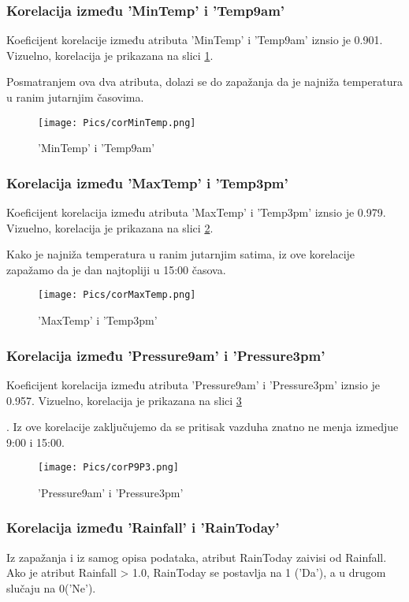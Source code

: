 \documentclass[a4paper]{article}
\begin{document}
\subsubsection{Korelacija između 'MinTemp' i 'Temp9am'}
\label{subsubsec:korMinTemp}
Koeficijent korelacije između atributa 'MinTemp' i 'Temp9am' iznsio je 0.901. Vizuelno, korelacija je prikazana na slici \ref{fig:cor-1}. \par
Posmatranjem ova dva atributa, dolazi se do zapažanja da je najniža temperatura u ranim jutarnjim časovima.
\begin{figure}[H]
     \centering
     \texttt{[image: Pics/corMinTemp.png]}
     \caption{'MinTemp' i 'Temp9am'}
     \label{fig:cor-1}
\end{figure}

\subsubsection{Korelacija između 'MaxTemp' i 'Temp3pm'}
\label{subsubsec:korMaxTemp}
Koeficijent korelacija između atributa 'MaxTemp' i 'Temp3pm' iznsio je 0.979. Vizuelno, korelacija je prikazana na slici \ref{fig:cor-2}.\par
Kako je najniža temperatura u ranim jutarnjim satima, iz ove korelacije zapažamo da je dan najtopliji u 15:00 časova.
\begin{figure}[H]
     \centering
     \texttt{[image: Pics/corMaxTemp.png]}
     \caption{'MaxTemp' i 'Temp3pm'}
     \label{fig:cor-2}
\end{figure}


\subsubsection{Korelacija između 'Pressure9am' i 'Pressure3pm'}
\label{subsubsec:kotP9P3}
Koeficijent korelacija između atributa 'Pressure9am' i 'Pressure3pm' iznsio je 0.957. Vizuelno, korelacija je prikazana na slici \ref{fig:cor-3}\par.
Iz ove korelacije zaključujemo da se pritisak vazduha znatno ne menja izmedjue 9:00 i 15:00.
\begin{figure}[H]
     \centering
     \texttt{[image: Pics/corP9P3.png]}
     \caption{'Pressure9am' i 'Pressure3pm'}
     \label{fig:cor-3}
\end{figure}


\subsubsection{Korelacija između 'Rainfall' i 'RainToday'}
\label{subsubsec:korRaRT}
Iz zapažanja i iz samog opisa podataka, atribut RainToday zaivisi od Rainfall. Ako je atribut Rainfall > 1.0, RainToday se postavlja na 1 ('Da'), a u drugom slučaju na 0('Ne').\par
\end{document}
